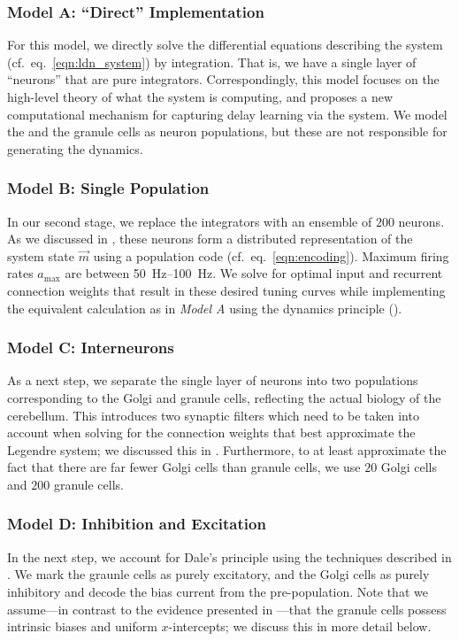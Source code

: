 \subsubsection{Model A: \enquote{Direct} Implementation} 
For this model, we directly solve the differential equations describing the \LDN system (cf.~eq.~\ref{eqn:ldn_system}) by integration.
That is, we have a single layer of \enquote{neurons} that are pure integrators.
Correspondingly, this model focuses on the high-level theory of what the system is computing, and proposes a new computational mechanism for capturing delay learning via the \LDN system.
We model the \PCN and the granule cells as neuron populations, but these are not responsible for generating the dynamics.

\subsubsection{Model B: Single Population}
In our second stage, we replace the integrators with an ensemble of $200$ \LIF neurons.
As we discussed in , these neurons form a distributed representation of the \LDN system state $\vec{m}$ using a population code (cf.~eq.~\ref{eqn:encoding}).
Maximum firing rates $a_\mathrm{max}$ are between \SIrange{50}{100}{\hertz}.
We solve for optimal input and recurrent connection weights that result in these desired tuning curves while implementing the equivalent calculation as in \emph{Model A} using the \NEF dynamics principle ().

\subsubsection{Model C: Interneurons}
As a next step, we separate the single layer of neurons into two populations corresponding to the Golgi and granule cells, reflecting the actual biology of the cerebellum.
This introduces two synaptic filters which need to be taken into account when solving for the connection weights that best approximate the Legendre system; we discussed this in .
Furthermore, to at least approximate the fact that there are far fewer Golgi cells than granule cells, we use $20$ Golgi cells and $200$ granule cells.

\subsubsection{Model D: Inhibition and Excitation}
In the next step, we account for Dale's principle using the techniques described in .
We mark the graunle cells as purely excitatory, and the Golgi cells as purely inhibitory and decode the bias current from the pre-population.
Note that we assume---in contrast to the evidence presented in ---that the granule cells possess intrinsic biases and uniform $x$-intercepts; we discuss this in more detail below.

